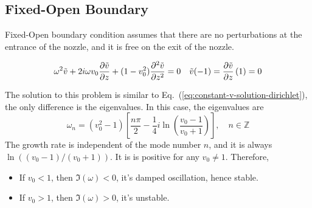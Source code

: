 \subsection{Fixed-Open Boundary}
Fixed-Open boundary condition assumes that there are no perturbations at the entrance of the nozzle, and it is free on the exit of the nozzle.

\begin{equation} \label{eq:constant-v-problem-fixed-open}
	\omega^2\tilde{v} + 2i\omega v_0\pdv{\tilde{v}}{z} + (1-v_0^2)\pdv[2]{\tilde{v}}{z} = 0
	\quad
	\tilde{v}(-1) = \pdv{\tilde{v}}{z}\,(1) = 0
\end{equation}

The solution to this problem is similar to Eq.~(\ref{eq:constant-v-solution-dirichlet}), the only difference is the eigenvalues. In this case, the eigenvalues are
\begin{equation}
	\omega_n = (v_0^2 - 1) \left[\frac{n\pi}{2} - \frac{1}{4}i\ln(\frac{v_0-1}{v_0+1})\right], \quad n\in\mathbb{Z}
	\label{eq:eigvals-constant-v-fixed-open}
\end{equation}
The growth rate is independent of the mode number $n$, and it is always $\ln((v_0-1)/(v_0+1))$. It is is positive for any $v_0\neq 1$. Therefore,
\begin{itemize}
	\item If $v_0<1$, then $\Im(\omega)<0$, it's damped oscillation, hence stable.
	\item If $v_0>1$, then $\Im(\omega)>0$, it's unstable.
\end{itemize}

